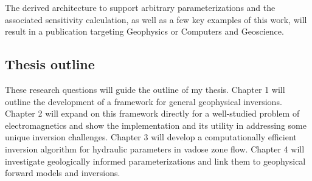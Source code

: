 \documentclass[11pt]{article}
\begin{document}
The derived architecture to support arbitrary parameterizations and the associated sensitivity calculation, as well as a few key examples of this work, will result in a publication targeting Geophysics or Computers and Geoscience.

\subsection{Thesis outline}

These research questions will guide the outline of my thesis. Chapter 1 will outline the development of a framework for general geophysical inversions. Chapter 2 will expand on this framework directly for a well-studied problem of electromagnetics and show the implementation and its utility in addressing some unique inversion challenges. Chapter 3 will develop a computationally efficient inversion algorithm for hydraulic parameters in vadose zone flow. Chapter 4 will investigate geologically informed parameterizations and link them to geophysical forward models and inversions.

\newpage


\end{document}

